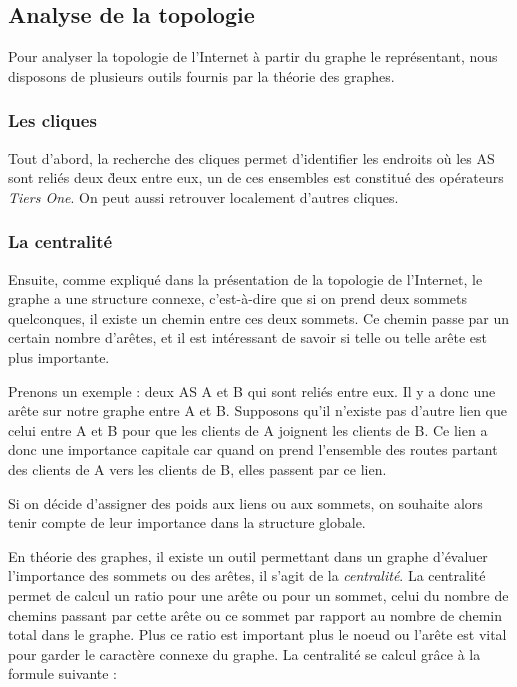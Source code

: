

%

\subsection{Analyse de la topologie}

\par
Pour analyser la topologie de l'Internet \`a partir du graphe le repr\'esentant, nous disposons de plusieurs outils fournis par la th\'eorie des graphes.

\subsubsection{Les cliques}

Tout d'abord, la recherche des cliques permet d'identifier les endroits o\`u les AS sont reli\'es deux \` deux entre eux, un de ces ensembles est constitu\'e des op\'erateurs \textit{Tiers One}. On peut aussi retrouver localement d'autres cliques.

\subsubsection{La centralit\'e}

\par
Ensuite, comme expliqu\'e dans la pr\'esentation de la topologie de l'Internet, le graphe a une structure connexe, c'est-\`a-dire que si on prend deux sommets quelconques, il existe un chemin entre ces deux sommets.
Ce chemin passe par un certain nombre d'ar\^etes, et il est int\'eressant de savoir si telle ou telle ar\^ete est plus importante.
\par
Prenons un exemple : deux AS A et B qui sont reli\'es entre eux. Il y a donc une ar\^ete sur notre graphe entre A et B. Supposons qu'il n'existe pas d'autre lien que celui entre A et B pour que les clients de A joignent les clients de B. Ce lien a donc une importance capitale car quand on prend l'ensemble des routes partant des clients de A vers les clients de B, elles passent par ce lien.
\par
Si on d\'ecide d'assigner des poids aux liens ou aux sommets, on souhaite alors tenir compte de leur importance dans la structure globale.

\par
En th\'eorie des graphes, il existe un outil permettant dans un graphe d'\'evaluer l'importance des sommets ou des ar\^etes, il s'agit de la \textit{centralit\'e}. La centralit\'e permet de calcul un ratio pour une ar\^ete ou pour un sommet, celui du nombre de chemins passant par cette ar\^ete ou ce sommet par rapport au nombre de chemin total dans le graphe. Plus ce ratio est important plus le noeud ou l'ar\^ete est vital pour garder le caract\`ere connexe du graphe. La centralit\'e se calcul gr\^ace \`a la formule suivante :

